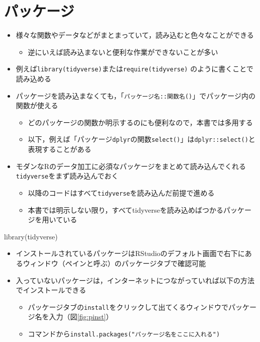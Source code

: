 \documentclass[
  xelatex,ja=standard, b5paper]{bxjsbook}
\newenvironment{Shaded}{\begin{snugshade}}{\end{snugshade}}
\newcommand{\FunctionTok}[1]{\textcolor[rgb]{0.00,0.00,0.00}{#1}}
\newcommand{\NormalTok}[1]{#1}
\providecommand{\tightlist}{%
  \setlength{\itemsep}{0pt}\setlength{\parskip}{0pt}}
\begin{document}
\hypertarget{p-package}{%
\section{パッケージ}\label{p-package}}

\begin{itemize}
\tightlist
\item
  様々な関数やデータなどがまとまっていて，読み込むと色々なことができる

  \begin{itemize}
  \tightlist
  \item
    逆にいえば読み込まないと便利な作業ができないことが多い
  \end{itemize}
\item
  例えば\texttt{library(tidyverse)}または\texttt{require(tidyverse)} のように書くことで読み込める
\item
  パッケージを読み込まなくても，「\texttt{パッケージ名::関数名()}」でパッケージ内の関数が使える

  \begin{itemize}
  \tightlist
  \item
    どのパッケージの関数か明示するのにも便利なので，本書では多用する
  \item
    以下，例えば「パッケージ\texttt{dplyr}の関数\texttt{select()}」は\texttt{dplyr::select()}と表現することがある
  \end{itemize}
\item
  モダンなRのデータ加工に必須なパッケージをまとめて読み込んでくれる\texttt{tidyverse}をまず読み込んでおく

  \begin{itemize}
  \tightlist
  \item
    以降のコードはすべて\texttt{tidyverse}を読み込んだ前提で進める
  \item
    本書では明示しない限り，すべてtidyverseを読み込めばつかるパッケージを用いている
  \end{itemize}
\end{itemize}

\begin{Shaded}
\begin{Highlighting}[]
\FunctionTok{library}\NormalTok{(tidyverse)}
\end{Highlighting}
\end{Shaded}

\begin{itemize}
\tightlist
\item
  インストールされているパッケージはRStudioのデフォルト画面で右下にあるウィンドウ（ペインと呼ぶ）のパッケージタブで確認可能\\
\item
  入っていないパッケージは，インターネットにつながっていれば以下の方法でインストールできる

  \begin{itemize}
  \tightlist
  \item
    パッケージタブの\texttt{install}をクリックして出てくるウィンドウでパッケージ名を入力（図\ref{fig:pinst}）
  \item
    コマンドから\texttt{install.packages("パッケージ名をここに入れる")}
  \end{itemize}
\end{itemize}
\end{document}

